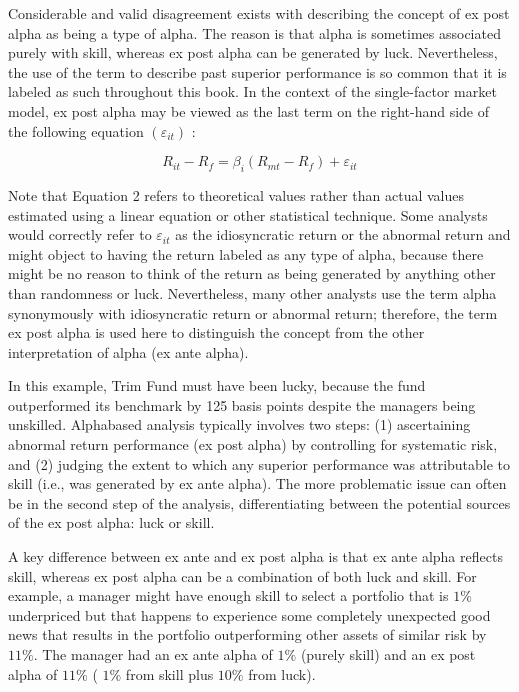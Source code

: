 \documentclass[11pt]{article}
\begin{document}
Considerable and valid disagreement exists with describing the concept of ex post alpha as being a type of alpha. The reason is that alpha is sometimes associated purely with skill, whereas ex post alpha can be generated by luck. Nevertheless, the use of the term to describe past superior performance is so common that it is labeled as such throughout this book. In the context of the single-factor market model, ex post alpha may be viewed as the last term on the right-hand side of the following equation $\left(\varepsilon_{i t}\right)$ :


\begin{equation*}
R_{i t}-R_{f}=\beta_{i}\left(R_{m t}-R_{f}\right)+\varepsilon_{i t} \tag{2}
\end{equation*}


Note that Equation 2 refers to theoretical values rather than actual values estimated using a linear equation or other statistical technique. Some analysts would correctly refer to $\varepsilon_{i t}$ as the idiosyncratic return or the abnormal return and might object to having the return labeled as any type of alpha, because there might be no reason to think of the return as being generated by anything other than randomness or luck. Nevertheless, many other analysts use the term alpha synonymously with idiosyncratic return or abnormal return; therefore, the term ex post alpha is used here to distinguish the concept from the other interpretation of alpha (ex ante alpha).

In this example, Trim Fund must have been lucky, because the fund outperformed its benchmark by 125 basis points despite the managers being unskilled. Alphabased analysis typically involves two steps: (1) ascertaining abnormal return performance (ex post alpha) by controlling for systematic risk, and (2) judging the extent to which any superior performance was attributable to skill (i.e., was generated by ex ante alpha). The more problematic issue can often be in the second step of the analysis, differentiating between the potential sources of the ex post alpha: luck or skill.

A key difference between ex ante and ex post alpha is that ex ante alpha reflects skill, whereas ex post alpha can be a combination of both luck and skill. For example, a manager might have enough skill to select a portfolio that is $1 \%$ underpriced but that happens to experience some completely unexpected good news that results in the portfolio outperforming other assets of similar risk by $11 \%$. The manager had an ex ante alpha of $1 \%$ (purely skill) and an ex post alpha of $11 \%$ ( $1 \%$ from skill plus $10 \%$ from luck).
\end{document}
